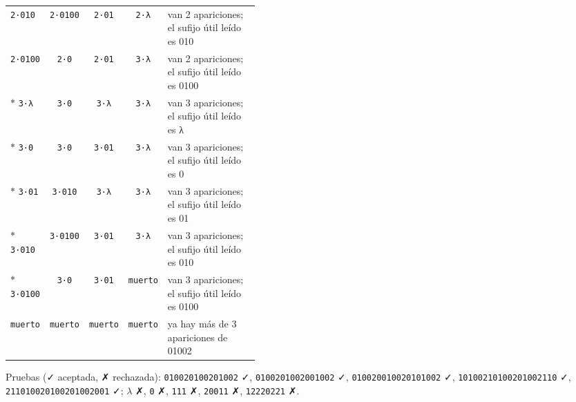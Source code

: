 \documentclass[11pt]{article}
\begin{document}
\begin{center}
\begin{tabular}{lcccp{0.42\linewidth}}
 \texttt{2·010} & \texttt{2·0100} & \texttt{2·01} & \texttt{2·λ} & van 2 apariciones; el sufijo útil leído es 010 \\
 \texttt{2·0100} & \texttt{2·0} & \texttt{2·01} & \texttt{3·λ} & van 2 apariciones; el sufijo útil leído es 0100 \\
$*$ \texttt{3·λ} & \texttt{3·0} & \texttt{3·λ} & \texttt{3·λ} & van 3 apariciones; el sufijo útil leído es λ \\
$*$ \texttt{3·0} & \texttt{3·0} & \texttt{3·01} & \texttt{3·λ} & van 3 apariciones; el sufijo útil leído es 0 \\
$*$ \texttt{3·01} & \texttt{3·010} & \texttt{3·λ} & \texttt{3·λ} & van 3 apariciones; el sufijo útil leído es 01 \\
$*$ \texttt{3·010} & \texttt{3·0100} & \texttt{3·01} & \texttt{3·λ} & van 3 apariciones; el sufijo útil leído es 010 \\
$*$ \texttt{3·0100} & \texttt{3·0} & \texttt{3·01} & \texttt{muerto} & van 3 apariciones; el sufijo útil leído es 0100 \\
 \texttt{muerto} & \texttt{muerto} & \texttt{muerto} & \texttt{muerto} & ya hay más de 3 apariciones de 01002 \\
\bottomrule\end{tabular}\end{center}
Pruebas (✓ aceptada, ✗ rechazada): \texttt{010020100201002} ✓, \texttt{0100201002001002} ✓, \texttt{010020010020101002} ✓, \texttt{10100210100201002110} ✓, \texttt{211010020100201002001} ✓; $\lambda$ ✗, \texttt{0} ✗, \texttt{111} ✗, \texttt{20011} ✗, \texttt{12220221} ✗.
\end{document}
